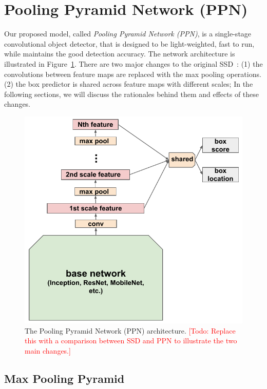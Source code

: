 \documentclass[10pt,twocolumn,letterpaper]{article}
\newcommand{\todo}[1]{\textcolor{red}{[Todo: #1]}}
\begin{document}
\section{Pooling Pyramid Network (PPN)}
Our proposed model, called \textit{Pooling Pyramid Network (PPN)},
is a single-stage convolutional object detector,
that is designed to be light-weighted, fast to run,
while maintains the good detection accuracy.
The network architecture is illustrated in Figure~\ref{fig:ppn}.
There are two major changes to the original SSD~\cite{liu2016ssd}:
(1) the convolutions between feature maps are replaced with the max pooling operations.
(2) the box predictor is shared across feature maps with different scales;
In the following sections, we will discuss the rationales behind them and effects of these changes.

\begin{figure}[t]
\begin{center}
\includegraphics[width=0.8\linewidth]{figure/ppn.pdf}
\end{center}
\caption{
  The Pooling Pyramid Network (PPN) architecture.
  \todo{Replace this with a comparison between SSD and PPN
  to illustrate the two main changes.}
}
\label{fig:ppn}
\end{figure}

\subsection{Max Pooling Pyramid}
\end{document}
